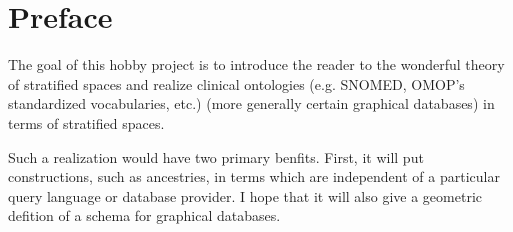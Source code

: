 \chapter*{Preface}


The goal of this hobby project is to introduce the reader to the wonderful
theory of stratified spaces and realize clinical ontologies (e.g. SNOMED,
OMOP's standardized vocabularies, etc.) (more generally certain graphical 
databases) in terms of stratified spaces.

Such a realization would have two primary benfits. First, it will put
constructions, such as ancestries, in terms which are independent of a
particular query language or database provider. I hope that it will also give a
geometric defition of a schema for graphical databases.

